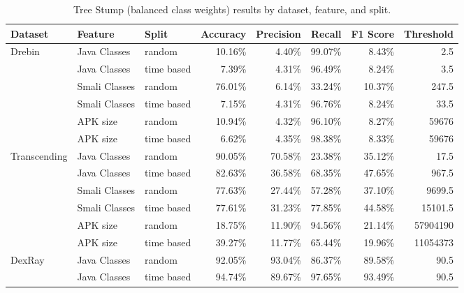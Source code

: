 \begin{table*}[t!]
    \caption{\label{tab:treestump} Tree Stump (balanced class weights) results by dataset, feature, and split.}
    \centering
    \small
    {\renewcommand{\arraystretch}{1.5} %
        \begin{tabularx}{\linewidth}{@{}l l l r r r r r@{}} %
            \toprule
            \textbf{Dataset} & \textbf{Feature} & \textbf{Split} & \textbf{Accuracy} & \textbf{Precision} & \textbf{Recall} & \textbf{F1 Score} & \textbf{Threshold} \\
            \midrule
            Drebin & Java Classes & random     & 10.16\% & 4.40\% & 99.07\% & 8.43\% & 2.5 \\
                   & Java Classes & time based & 7.39\%  & 4.31\% & 96.49\% & 8.24\% & 3.5 \\
                   & Smali Classes & random    & 76.01\% & 6.14\% & 33.24\% & 10.37\% & 247.5 \\
                   & Smali Classes & time based & 7.15\%  & 4.31\% & 96.76\% & 8.24\% & 33.5 \\
                   & APK size     & random     & 10.94\% & 4.32\% & 96.10\% & 8.27\% & 59676 \\
                   & APK size & time based & 6.62\%  & 4.35\% & 98.38\% & 8.33\% & 59676 \\
            \midrule
            Transcending & Java Classes & random     & 90.05\% & 70.58\% & 23.38\% & 35.12\% & 17.5 \\
                         & Java Classes & time based & 82.63\% & 36.58\% & 68.35\% & 47.65\% & 967.5 \\
                         & Smali Classes & random    & 77.63\% & 27.44\% & 57.28\% & 37.10\% & 9699.5 \\
                         & Smali Classes & time based & 77.61\% & 31.23\% & 77.85\% & 44.58\% & 15101.5 \\
                         & APK size     & random     & 18.75\% & 11.90\% & 94.56\% & 21.14\% & 57904190 \\
                         & APK size & time based & 39.27\% & 11.77\% & 65.44\% & 19.96\% & 11054373 \\
            \midrule
            DexRay & Java Classes & random     & 92.05\% & 93.04\% & 86.37\% & 89.58\% & 90.5 \\
                   & Java Classes & time based & 94.74\% & 89.67\% & 97.65\% & 93.49\% & 90.5 \\

\end{tabularx}}
\end{table*}
